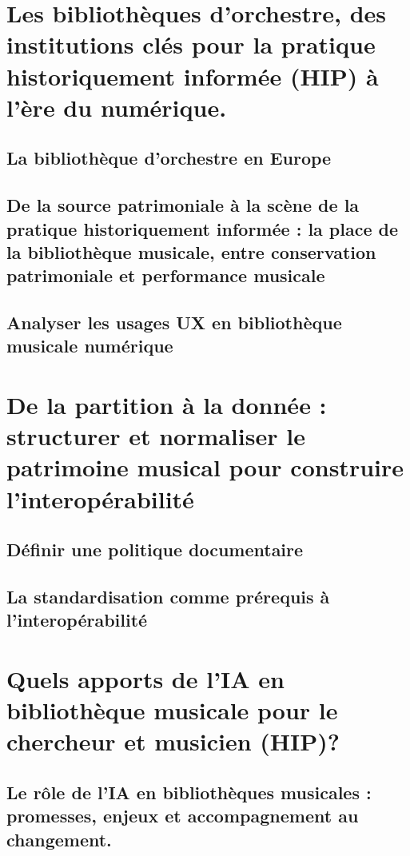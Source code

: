 \documentclass[12pt,twoside]{book}
\begin{document}
	
	
	\part{Les bibliothèques d’orchestre, des institutions clés pour la pratique historiquement informée (HIP) à l’ère du numérique.}
	\chapter{La bibliothèque d'orchestre en Europe}

	\chapter{De la source patrimoniale à la scène de la pratique historiquement informée : la place de la bibliothèque musicale, entre conservation patrimoniale et performance musicale}

	\chapter{Analyser les usages UX en bibliothèque musicale numérique}
	
	
	
	\part{De la partition à la donnée : structurer et normaliser le patrimoine musical pour construire l'interopérabilité}
	\chapter{Définir une politique documentaire}

	\chapter{La standardisation comme prérequis à l'interopérabilité}


	
	\part{Quels apports de l'IA en bibliothèque musicale pour le chercheur et musicien (HIP)?}
	
	\chapter{Le rôle de l'IA en bibliothèques musicales : promesses, enjeux et accompagnement au changement. }

\end{document}
